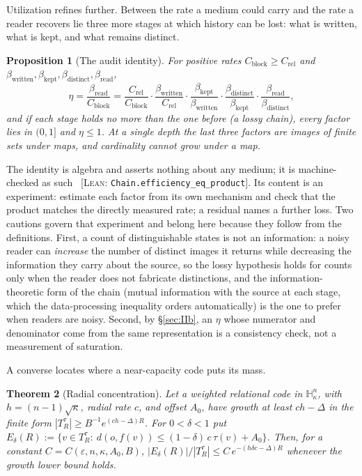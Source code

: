 \documentclass[11pt,reqno]{amsart}
\theoremstyle{plain}
\newtheorem{theorem}{Theorem}[section]
\newtheorem{proposition}[theorem]{Proposition}
\theoremstyle{definition}
\newcommand{\Crel}{C_{\mathrm{rel}}}
\newcommand{\Cblock}{C_{\mathrm{block}}}
\newcommand{\Hk}{\mathbb{H}^n_\kappa}
\newcommand{\eps}{\varepsilon}
\newcommand{\cert}[1]{{\footnotesize\ [\textsc{Lean}: \texttt{#1}]}}
\begin{document}
Utilization refines further. Between the rate a medium could carry and the rate a reader recovers lie three more stages at which history can be lost: what is written, what is kept, and what remains distinct.

\begin{proposition}[The audit identity]\label{prop:audit}
For positive rates $\Cblock\ge\Crel$ and $\beta_{\mathrm{written}},\beta_{\mathrm{kept}},\beta_{\mathrm{distinct}},\beta_{\mathrm{read}}$,
\[
\eta=\frac{\beta_{\mathrm{read}}}{\Cblock}
=\frac{\Crel}{\Cblock}\cdot\frac{\beta_{\mathrm{written}}}{\Crel}\cdot\frac{\beta_{\mathrm{kept}}}{\beta_{\mathrm{written}}}\cdot\frac{\beta_{\mathrm{distinct}}}{\beta_{\mathrm{kept}}}\cdot\frac{\beta_{\mathrm{read}}}{\beta_{\mathrm{distinct}}},
\]
and if each stage holds no more than the one before (a \emph{lossy} chain), every factor lies in $(0,1]$ and $\eta\le1$. At a single depth the last three factors are images of finite sets under maps, and cardinality cannot grow under a map.
\end{proposition}

The identity is algebra and asserts nothing about any medium; it is machine-checked as such \cert{Chain.efficiency\_\allowbreak{}eq\_\allowbreak{}product}. Its content is an experiment: estimate each factor from its own mechanism and check that the product matches the directly measured rate; a residual names a further loss. Two cautions govern that experiment and belong here because they follow from the definitions. First, a count of distinguishable states is not an information: a noisy reader can \emph{increase} the number of distinct images it returns while decreasing the information they carry about the source, so the lossy hypothesis holds for counts only when the reader does not fabricate distinctions, and the information-theoretic form of the chain (mutual information with the source at each stage, which the data-processing inequality orders automatically) is the one to prefer when readers are noisy. Second, by \S\ref{sec:IIb}, an $\eta$ whose numerator and denominator come from the same representation is a consistency check, not a measurement of saturation.

A converse locates where a near-capacity code puts its mass.

\begin{theorem}[Radial concentration]\label{thm:radial}
Let a weighted relational code in $\Hk$, with $h=(n-1)\sqrt\kappa$, radial rate $c$, and offset $A_0$, have growth at least $ch-\Delta$ in the finite form $|T_R^\tau|\ge B^{-1}e^{(ch-\Delta)R}$. For $0<\delta<1$ put $E_\delta(R):=\{v\in T_R^\tau:\ d(o,f(v))\le(1-\delta)\,c\,\tau(v)+A_0\}$. Then, for a constant $C=C(\eps,n,\kappa,A_0,B)$, $|E_\delta(R)|/|T_R^\tau|\le C\,e^{-(h\delta c-\Delta)R}$ whenever the growth lower bound holds.
\end{theorem}
\end{document}
